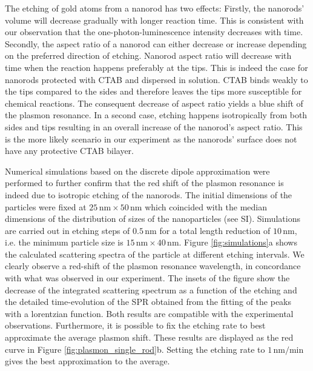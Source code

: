 \documentclass[a4paper,oneside,onecolumn]{article}
\newcommand{\nm}{\ensuremath{\,\textrm{nm}}}
\begin{document}
The etching of gold atoms from a nanorod has two effects: Firstly, the
nanorods' volume will decrease gradually with longer reaction time. This is
consistent with our observation that the one-photon-luminescence intensity
decreases with time. Secondly, the aspect ratio of a nanorod can either
decrease or increase depending on the preferred direction of etching.
Nanorod aspect ratio will decrease with time when the reaction happens
preferably at the tips. This is indeed the case for nanorods protected with
CTAB and dispersed in solution\cite{Jana2002}. CTAB binds weakly to the tips
compared to the sides and therefore leaves the tips more susceptible for
chemical reactions\cite{Caswell2003}. The consequent decrease of aspect ratio
yields a blue shift of the plasmon resonance\cite{Link1999}. In a second case,
etching happens isotropically from both sides and tips resulting in an overall
increase of the nanorod's aspect ratio. This is the more likely scenario in
our experiment as the nanorods' surface does not have any protective CTAB bilayer.

Numerical simulations based on the discrete dipole approximation were
performed to further confirm that the red shift of the plasmon resonance is
indeed due to isotropic etching of the nanorods. The initial dimensions of the
particles were fixed at $25\nm\times50\nm$ which coincided with the median
dimensions of the distribution of sizes of the nanoparticles (see SI). Simulations are carried out in etching steps of $0.5\nm$ for a total length reduction of $10\nm$, i.e.
the minimum particle size is $15\nm\times 40 \nm$. Figure
\ref{fig:simulations}a shows the calculated scattering spectra of the particle at
different etching intervals. We clearly observe a red-shift of the plasmon
resonance wavelength, in concordance with what was observed in our experiment. The insets of the
figure show the decrease of the integrated scattering spectrum as a function of
the etching and the detailed time-evolution of the SPR obtained from the fitting
of the peaks with a lorentzian function. Both results are compatible with the
experimental observations. Furthermore, it is possible to fix the etching rate to
best approximate the average plasmon shift. These results are displayed as the
red curve in Figure \ref{fig:plasmon_single_rod}b. Setting the etching rate to $1\nm/\textrm{min}$ gives the best approximation to the average.
\end{document}

